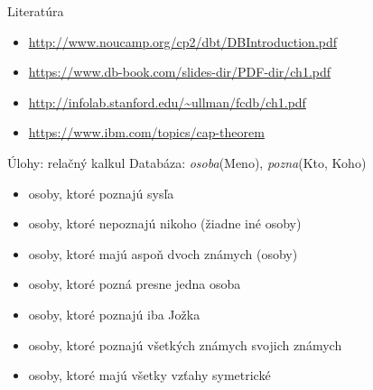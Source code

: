 \documentclass[12pt]{beamer}
\begin{document}
\begin{frame}{Literatúra}
\begin{itemize}
\item {\scriptsize\url{http://www.noucamp.org/cp2/dbt/DBIntroduction.pdf}}
\item {\scriptsize\url{https://www.db-book.com/slides-dir/PDF-dir/ch1.pdf}}
\item {\scriptsize\url{http://infolab.stanford.edu/~ullman/fcdb/ch1.pdf}}
\item {\scriptsize\url{https://www.ibm.com/topics/cap-theorem}}
\end{itemize}
\end{frame}


\begin{frame}{Úlohy: relačný kalkul}
Databáza: \emph{osoba}(Meno), \emph{pozna}(Kto, Koho)
\begin{itemize}
    \item osoby, ktoré poznajú sysľa
    \item osoby, ktoré nepoznajú nikoho (žiadne iné osoby)
    \item osoby, ktoré majú aspoň dvoch známych (osoby)
    \item osoby, ktoré pozná presne jedna osoba
    \item osoby, ktoré poznajú iba Jožka
    \item osoby, ktoré poznajú všetkých známych svojich známych
    \item osoby, ktoré majú všetky vzťahy symetrické
\end{itemize}
\end{frame}
\end{document}
